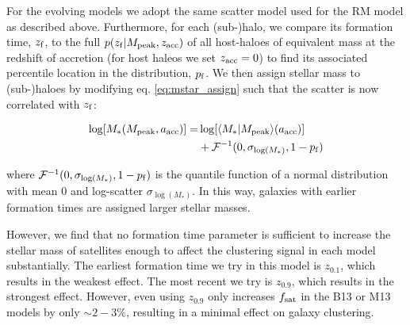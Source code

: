 \documentclass[a4paper,fleqn,usenatbib]{mnras}
\begin{document}
For the evolving models we adopt the same scatter model used for the RM model as described above.  Furthermore, for each (sub-)halo, we compare its formation time, $z_{\rm f}$, to the full $p(z_{\rm f} | M_{\rm peak}, z_{\rm acc})$ of all host-haloes of equivalent mass at the redshift of accretion (for host haleos we set $z_{\rm acc}=0$) to find its associated percentile location in the distribution, $p_{\rm f}$.  We then assign stellar mass to (sub-)haloes by modifying eq. \ref{eq:mstar_assign} such that the scatter is now correlated with $z_{\rm f}$:
%
\begin{linenomath}
\begin{align}
\log[M_*(M_{\rm peak}, a_{\rm acc})] =& \log[\langle M_* | M_{\rm peak}\rangle(a_{\rm acc})] \\ \nonumber
&+ \mathcal{F}^{-1}(0,\sigma_{\log(M_*)}, 1-p_{\rm f})
\end{align}
\end{linenomath}
%
where $\mathcal{F}^{-1}(0,\sigma_{\log(M_*)}, 1-p_{\rm f})$ is the quantile function of a normal distribution with mean 0 and log-scatter $\sigma_{\log(M_*)}$.  In this way, galaxies with earlier formation times are assigned larger stellar masses. 

However, we find that no formation time parameter is sufficient to increase the stellar mass of satellites enough to affect the clustering signal in each model substantially. The earliest formation time we try in this model is $z_{0.1}$, which results in the weakest effect.  The most recent we try is $z_{0.9}$, which results in the strongest effect. However, even using $z_{0.9}$ only increases $f_{\rm sat}$ in the B13 or M13 models by only $\sim 2-3\%$, resulting in a minimal effect on galaxy clustering.
      


\end{document}
